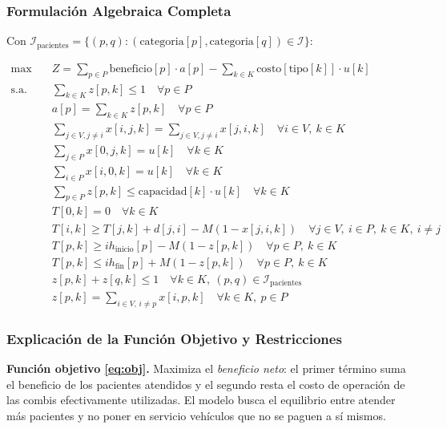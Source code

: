 \documentclass[12pt]{article}
\numberwithin{algorithm}{section}
\begin{document}
\subsubsection{Formulación Algebraica Completa}

Con
$\mathcal{I}_{\text{pacientes}} = \{(p,q) : (\text{categoria}[p], \text{categoria}[q]) \in \mathcal{I}\}$:

\begin{align}
  \max \quad & Z = \sum_{p \in P} \text{beneficio}[p] \cdot a[p] - \sum_{k \in K} \text{costo}[\text{tipo}[k]] \cdot u[k] \label{eq:obj}\\
  \text{s.a.} \quad
  & \sum_{k \in K} z[p,k] \leq 1 \quad \forall p \in P \label{eq:cov1}\\
  & a[p] = \sum_{k \in K} z[p,k] \quad \forall p \in P \label{eq:cov2}\\
  & \sum_{j \in V, j \neq i} x[i,j,k] = \sum_{j \in V, j \neq i} x[j,i,k] \quad \forall i \in V,\ k \in K \label{eq:flow}\\
  & \sum_{j \in P} x[0,j,k] = u[k] \quad \forall k \in K \label{eq:depart}\\
  & \sum_{i \in P} x[i,0,k] = u[k] \quad \forall k \in K \label{eq:return}\\
  & \sum_{p \in P} z[p,k] \leq \text{capacidad}[k] \cdot u[k] \quad \forall k \in K \label{eq:cap}\\
  & T[0,k] = 0 \quad \forall k \in K \label{eq:t0}\\
  & T[i,k] \geq T[j,k] + d[j,i] - M(1 - x[j,i,k]) \quad \forall j \in V,\ i \in P,\ k \in K,\ i \neq j \label{eq:tprop}\\
  & T[p,k] \geq ih_{\text{inicio}}[p] - M(1 - z[p,k]) \quad \forall p \in P,\ k \in K \label{eq:twin_lower}\\
  & T[p,k] \leq ih_{\text{fin}}[p] + M(1 - z[p,k]) \quad \forall p \in P,\ k \in K \label{eq:twin_upper}\\
  & z[p,k] + z[q,k] \leq 1 \quad \forall k \in K,\ (p,q) \in \mathcal{I}_{\text{pacientes}} \label{eq:incompat}\\
  & z[p,k] = \sum_{i \in V,\, i \neq p} x[i,p,k] \quad \forall k \in K,\ p \in P \label{eq:vinczx}
\end{align}

\subsubsection{Explicación de la Función Objetivo y Restricciones}

\textbf{Función objetivo \eqref{eq:obj}.} Maximiza el \emph{beneficio neto}: el primer término
suma el beneficio de los pacientes atendidos y el segundo resta el costo de operación de las
combis efectivamente utilizadas. El modelo busca el equilibrio entre atender más pacientes y
no poner en servicio vehículos que no se paguen a sí mismos.
\end{document}
